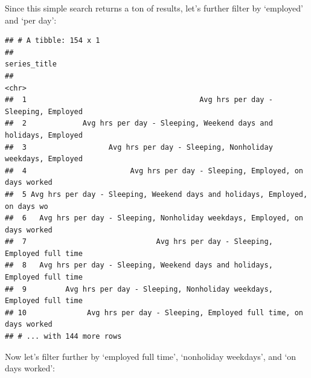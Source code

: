 \documentclass[]{book}
\newenvironment{Shaded}{\begin{snugshade}}{\end{snugshade}}
\newcommand{\KeywordTok}[1]{\textcolor[rgb]{0.13,0.29,0.53}{\textbf{{#1}}}}
\newcommand{\DataTypeTok}[1]{\textcolor[rgb]{0.13,0.29,0.53}{{#1}}}
\newcommand{\StringTok}[1]{\textcolor[rgb]{0.31,0.60,0.02}{{#1}}}
\newcommand{\OtherTok}[1]{\textcolor[rgb]{0.56,0.35,0.01}{{#1}}}
\newcommand{\NormalTok}[1]{{#1}}
\theoremstyle{definition}
\theoremstyle{definition}
\theoremstyle{remark}
\begin{document}
Since this simple search returns a ton of results, let's further filter
by `employed' and `per day':

\begin{Shaded}
\end{Shaded}

\begin{verbatim}
## # A tibble: 154 x 1
##                                                                   series_title
##                                                                          <chr>
##  1                                        Avg hrs per day - Sleeping, Employed
##  2             Avg hrs per day - Sleeping, Weekend days and holidays, Employed
##  3                   Avg hrs per day - Sleeping, Nonholiday weekdays, Employed
##  4                        Avg hrs per day - Sleeping, Employed, on days worked
##  5 Avg hrs per day - Sleeping, Weekend days and holidays, Employed, on days wo
##  6   Avg hrs per day - Sleeping, Nonholiday weekdays, Employed, on days worked
##  7                              Avg hrs per day - Sleeping, Employed full time
##  8   Avg hrs per day - Sleeping, Weekend days and holidays, Employed full time
##  9         Avg hrs per day - Sleeping, Nonholiday weekdays, Employed full time
## 10              Avg hrs per day - Sleeping, Employed full time, on days worked
## # ... with 144 more rows
\end{verbatim}

Now let's filter further by `employed full time', `nonholiday weekdays',
and `on days worked':

\begin{Shaded}
\end{Shaded}
\end{document}
